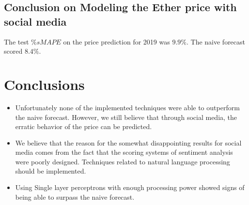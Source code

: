 \subsection{Conclusion on Modeling the Ether price with social media}

The test $\%sMAPE$ on the price prediction for 2019  was $9.9\%$. The naive forecast scored $8.4\%$.


\section{Conclusions}

\begin{itemize}
	\item Unfortunately none of the implemented techniques were able to outperform the naive forecast. However, we still believe that through social media, the erratic behavior of the price can be predicted.
	\item We believe that the reason for the somewhat disappointing results for social media comes from the fact that the scoring systems of sentiment analysis were poorly designed. Techniques related to natural language processing should be implemented.
	\item Using Single layer perceptrons with enough processing power showed signs of being able to surpass the naive forecast.
\end{itemize}





